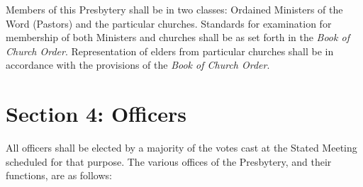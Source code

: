 \documentclass[
]{book}
\begin{document}
Members of this Presbytery shall be in two classes: Ordained Ministers of the Word (Pastors) and the particular churches. Standards for examination for membership of both Ministers and churches shall be as set forth in the \emph{Book of Church Order}. Representation of elders from particular churches shall be in accordance with the provisions of the \emph{Book of Church Order}.

\hypertarget{section-4-officers}{%
\section{Section 4: Officers}\label{section-4-officers}}

All officers shall be elected by a majority of the votes cast at the Stated Meeting scheduled for that purpose. The various offices of the Presbytery, and their functions, are as follows:
\end{document}
